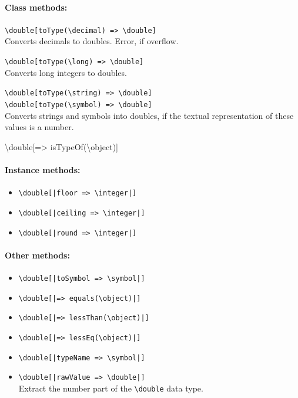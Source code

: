 \documentclass[11pt]{article}
\newcommand{\bs}{\textbackslash}
\begin{document}
\paragraph{Class methods:}
\begin{itemize}
\item {\tt \bs{}double[toType(\bs{}decimal) => \bs{}double]}\\  
  Converts decimals to doubles. Error, if overflow.
 \item {\tt \bs{}double[toType(\bs{}long) => \bs{}double]}\\  
  Converts long integers to doubles.
 \item {\tt \bs{}double[toType(\bs{}string) => \bs{}double]}\\  
 {\tt \bs{}double[toType(\bs{}symbol) => \bs{}double]}\\
  Converts strings and symbols into doubles, if the textual representation
  of these values is a number.
{\tt \item \bs{}double[=> isTypeOf(\bs{}object)]}  
\end{itemize}

\paragraph{Instance methods:}
\begin{itemize}
\item {\tt \bs{}double[|floor => \bs{}integer|]}
\item {\tt \bs{}double[|ceiling => \bs{}integer|]}
\item {\tt \bs{}double[|round => \bs{}integer|]}
\end{itemize}

\paragraph{Other methods:}
\begin{itemize}
\item {\tt \bs{}double[|toSymbol => \bs{}symbol|]}
\item {\tt \bs{}double[|=> equals(\bs{}object)|]}
\item {\tt \bs{}double[|=> lessThan(\bs{}object)|]}
\item {\tt \bs{}double[|=> lessEq(\bs{}object)|]}
\item {\tt \bs{}double[|typeName => \bs{}symbol|]}
\item {\tt \bs{}double[|rawValue => \bs{}double|]}
  \\
  Extract the number part of the {\tt \bs{}double} data type. 
\end{itemize}
\end{document}

